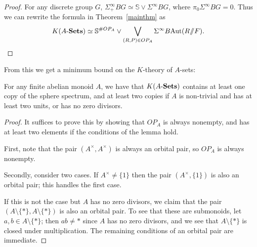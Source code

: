 \documentclass[11pt]{amsart}
\renewcommand{\ss}{\mathord{\sslash}}
\begin{document}
\begin{proof}
    For any discrete group $G$, $\Sigma^\infty_+ BG \simeq \mathbb{S} \vee \Sigma^\infty BG$, where $\pi_0\Sigma^\infty BG = 0$.  Thus we can rewrite the formula in Theorem~\ref{mainthm} as
    \[K(\ASets) \simeq \mathbb{S}^{\# OP_A} \vee \bigvee_{(R,P)\in OP_A} \Sigma^\infty B\Aut(R \ss F).\]
\end{proof}

From this we get a minimum bound on the $K$-theory of $A$-sets:

\begin{proposition}\label{always.a.sphere}
 For any finite abelian monoid $A$, we have that  $K(A\text{-}\mathbf{Sets})$ contains at least one copy of the sphere spectrum, and at least two copies if $A$ is non-trivial and has at least two units, or has no zero divisors.
\end{proposition}
 \begin{proof}
    It suffices to prove this by showing that $OP_A$ is always nonempty, and has at least two elements if the conditions of the lemma hold. 

    First, note that the pair $(A^\times,A^\times)$ is always an orbital pair, so $OP_A$ is always nonempty.  

    Secondly, consider two cases.  If $A^\times \neq \{1\}$ then the pair $(A^\times,\{1\})$ is also an orbital pair; this handles the first case.
    
    If this is not the case but $A$ has no zero divisors, we claim that the pair $(A \setminus \{*\}, A \setminus\{*\})$ is also an orbital pair.  To see that these are submonoids, let $a,b\in A\setminus\{*\}$; then $ab\neq *$ since $A$ has no zero divisors, and we see that $A\setminus\{*\}$ is closed under multiplication. The remaining conditions of an orbital pair are immediate.
 \end{proof}

\end{document}
